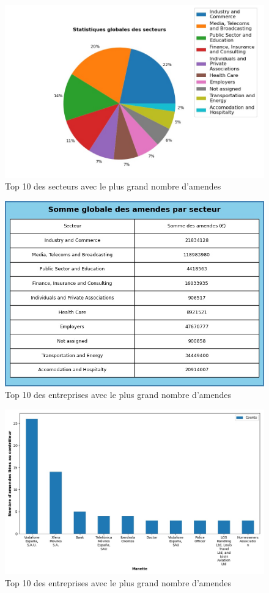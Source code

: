 \documentclass[french]{article}
\begin{document}
\newpage

	\begin{multicols}{2}
	\begin{figure}
		[H]\centering\includegraphics[width=1.0\linewidth]{graphs/sector_data}
		\caption{Top 10 des secteurs avec le plus grand nombre d'amendes}
	\end{figure}
	\begin{figure}
		[H]\centering\includegraphics[width=1\linewidth]{graphs/sector_data_fines}
		\caption{Top 10 des entreprises avec le plus grand nombre d'amendes}
	 \end{figure}
	
	\end{multicols}
	
	
	
	\begin{figure}
		[H]\centering\includegraphics[width=0.6\linewidth]{graphs/top10_controller}
		\caption{Top 10 des entreprises avec le plus grand nombre d'amendes}
	\end{figure}
	
\end{document}
